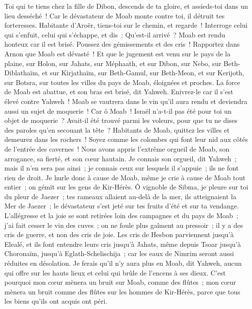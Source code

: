 \begin{multicols}{2}
Toi qui te tiens chez la fille de Dibon, descends de ta gloire, et assieds-toi dans un lieu desséché~! Car le dévastateur de Moab monte contre toi, il détruit tes forteresses.
Habitante d'Aroër, tiens-toi sur le chemin, et regarde~! Interroge celui qui s'enfuit, celui qui s'échappe, et dis~: Qu'est-il arrivé~?
Moab est rendu honteux car il est brisé. Poussez des gémissements et des cris~! Rapportez dans Arnon que Moab est dévasté~!
Et que le jugement est venu sur le pays de la plaine, sur Holon, sur Jahats, sur Méphaath,
et sur Dibon, sur Nebo, sur Beth-Diblathaïm,
et sur Kirjathaïm, sur Beth-Gamul, sur Beth-Meon,
et sur Kerijoth, sur Botsra, sur toutes les villes du pays de Moab, éloignées et proches.
La force de Moab est abattue, et son bras est brisé, dit Yahweh.
Enivrez-le car il s'est élevé contre Yahweh~! Moab se vautrera dans le vin qu'il aura rendu et deviendra aussi un sujet de moquerie~!
Car ô Moab~! Israël n'a-t-il pas été pour toi un objet de moquerie~? Avait-il été trouvé parmi les voleurs, pour que tu ne dises des paroles qu'en secouant la tête~?
Habitants de Moab, quittez les villes et demeurez dans les rochers~! Soyez comme les colombes qui font leur nid aux côtés de l'entrée des cavernes~!
Nous avons appris l'extrême orgueil de Moab, son arrogance, sa fierté, et son cœur hautain.
Je connais son orgueil, dit Yahweh~; mais il n'en sera pas ainsi~; je connais ceux sur lesquels il s'appuie~; ils ne font rien de droit. 
Je hurle donc à cause de Moab, même je crie à cause de Moab tout entier~; on gémit sur les gens de Kir-Hérès.
Ô vignoble de Sibma, je pleure sur toi du pleur de Jaezer~; tes rameaux allaient au-delà de la mer, ils atteignaient la Mer de Jaezer~; le dévastateur s'est jeté sur tes fruits d'été et sur ta vendange.
L'allégresse et la joie se sont retirées loin des campagnes et du pays de Moab~; j'ai fait cesser le vin des cuves~; on ne foule plus gaîment au pressoir~; il y a des cris de guerre, et non des cris de joie.
Les cris de Hesbon parviennent jusqu'à Elealé, et ils font entendre leurs cris jusqu'à Jahats, même depuis Tsoar jusqu'à Choronaïm, jusqu'à Eglath-Schelischija~; car les eaux de Nimrim seront aussi réduites en désolation.
Je ferais qu'il n'y aura plus en Moab, dit Yahweh, aucun qui offre sur les hauts lieux et celui qui brûle de l'encens à ses dieux. 
C'est pourquoi mon cœur mènera un bruit sur Moab, comme des flûtes~; mon cœur mènera un bruit comme des flûtes sur les hommes de Kir-Hérès, parce que tous les biens qu'ils ont acquis ont péri.

\end{multicols}
